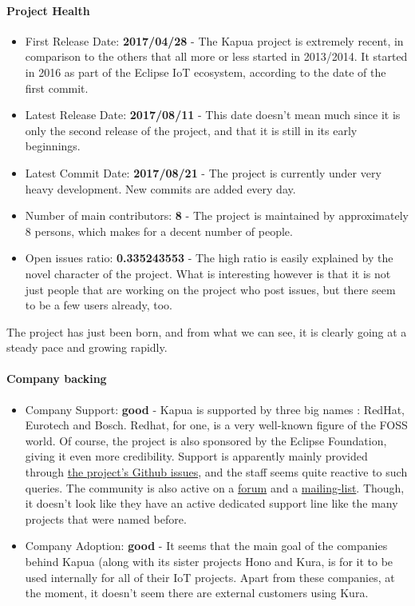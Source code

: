 \documentclass{article}
\begin{document}
\paragraph{Project Health}

\begin{itemize}
\item First Release Date: \textbf{2017/04/28} - The Kapua project is extremely recent, in comparison to the others that all more or less started in 2013/2014. It started in 2016 as part of the Eclipse IoT ecosystem, according to the date of the first commit.
\item Latest Release Date: \textbf{2017/08/11} - This date doesn't mean much since it is only the second release of the project, and that it is still in its early beginnings.
\item Latest Commit Date: \textbf{2017/08/21} - The project is currently under very heavy development. New commits are added every day.
\item Number of main contributors: \textbf{8} - The project is maintained by approximately 8 persons, which makes for a decent number of people.
\item Open issues ratio: \textbf{0.335243553} - The high ratio is easily explained by the novel character of the project. What is interesting however is that it is not just people that are working on the project who post issues, but there seem to be a few users already, too.
\end{itemize}

The project has just been born, and from what we can see, it is clearly going at a steady pace and growing rapidly.

\paragraph{Company backing}

\begin{itemize}
\item Company Support: \textbf{good} - Kapua is supported by three big names : RedHat, Eurotech and Bosch. Redhat, for one, is a very well-known figure of the FOSS world. Of course, the project is also sponsored by the Eclipse Foundation, giving it even more credibility. Support is apparently mainly provided through \href{https://github.com/eclipse/kapua/issues}{the project's Github issues}, and the staff seems quite reactive to such queries. The community is also active on a \href{https://www.eclipse.org/forums/index.php/f/340/}{forum} and a \href{https://dev.eclipse.org/mailman/listinfo/kapua-dev}{mailing-list}. Though, it doesn't look like they have an active dedicated support line like the many projects that were named before.
\item Company Adoption: \textbf{good} - It seems that the main goal of the companies behind Kapua (along with its sister projects Hono and Kura, is for it to be used internally for all of their IoT projects. Apart from these companies, at the moment, it doesn't seem there are external customers using Kura.
\end{itemize}
\end{document}
